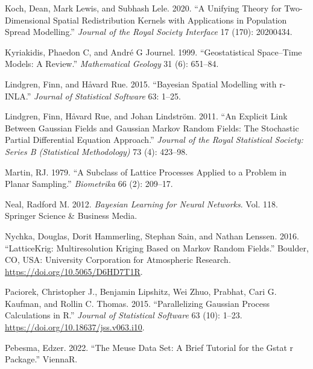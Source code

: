 \begin{CSLReferences}{1}{0}
\leavevmode{}%
Koch, Dean, Mark Lewis, and Subhash Lele. 2020. {``A Unifying Theory for Two-Dimensional Spatial Redistribution Kernels with Applications in Population Spread Modelling.''} \emph{Journal of the Royal Society Interface} 17 (170): 20200434.

\leavevmode{}%
Kyriakidis, Phaedon C, and André G Journel. 1999. {``Geostatistical Space--Time Models: A Review.''} \emph{Mathematical Geology} 31 (6): 651--84.

\leavevmode{}%
Lindgren, Finn, and Håvard Rue. 2015. {``Bayesian Spatial Modelling with r-INLA.''} \emph{Journal of Statistical Software} 63: 1--25.

\leavevmode{}%
Lindgren, Finn, Håvard Rue, and Johan Lindström. 2011. {``An Explicit Link Between Gaussian Fields and Gaussian Markov Random Fields: The Stochastic Partial Differential Equation Approach.''} \emph{Journal of the Royal Statistical Society: Series B (Statistical Methodology)} 73 (4): 423--98.

\leavevmode{}%
Martin, RJ. 1979. {``A Subclass of Lattice Processes Applied to a Problem in Planar Sampling.''} \emph{Biometrika} 66 (2): 209--17.

\leavevmode{}%
Neal, Radford M. 2012. \emph{Bayesian Learning for Neural Networks}. Vol. 118. Springer Science \& Business Media.

\leavevmode{}%
Nychka, Douglas, Dorit Hammerling, Stephan Sain, and Nathan Lenssen. 2016. {``LatticeKrig: Multiresolution Kriging Based on Markov Random Fields.''} Boulder, CO, USA: University Corporation for Atmospheric Research. \url{https://doi.org/10.5065/D6HD7T1R}.

\leavevmode{}%
Paciorek, Christopher J., Benjamin Lipshitz, Wei Zhuo, Prabhat, Cari G. Kaufman, and Rollin C. Thomas. 2015. {``Parallelizing Gaussian Process Calculations in {R}.''} \emph{Journal of Statistical Software} 63 (10): 1--23. \url{https://doi.org/10.18637/jss.v063.i10}.

\leavevmode{}%
Pebesma, Edzer. 2022. {``The Meuse Data Set: A Brief Tutorial for the Gstat r Package.''} ViennaR.


\end{CSLReferences}
